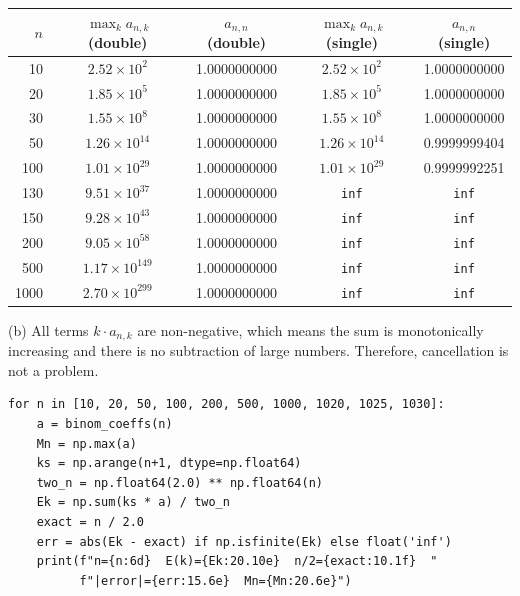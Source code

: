 \documentclass[letterpaper, 11pt]{article}
\newcommand{\1}{\mathds{1}}	%
\theoremstyle{definition}
\begin{document}
\begin{center}
\begin{tabular}{r|cc|cc}
$n$ & $\max_k a_{n,k}$ (double) & $a_{n,n}$ (double) & $\max_k a_{n,k}$ (single) & $a_{n,n}$ (single) \\
\hline
10 & $2.52 \times 10^{2}$ & 1.0000000000 & $2.52 \times 10^{2}$ & 1.0000000000 \\
20 & $1.85 \times 10^{5}$ & 1.0000000000 & $1.85 \times 10^{5}$ & 1.0000000000 \\
30 & $1.55 \times 10^{8}$ & 1.0000000000 & $1.55 \times 10^{8}$ & 1.0000000000 \\
50 & $1.26 \times 10^{14}$ & 1.0000000000 & $1.26 \times 10^{14}$ & 0.9999999404 \\
100 & $1.01 \times 10^{29}$ & 1.0000000000 & $1.01 \times 10^{29}$ & 0.9999992251 \\
130 & $9.51 \times 10^{37}$ & 1.0000000000 & \texttt{inf} & \texttt{inf} \\
150 & $9.28 \times 10^{43}$ & 1.0000000000 & \texttt{inf} & \texttt{inf} \\
200 & $9.05 \times 10^{58}$ & 1.0000000000 & \texttt{inf} & \texttt{inf} \\
500 & $1.17 \times 10^{149}$ & 1.0000000000 & \texttt{inf} & \texttt{inf} \\
1000 & $2.70 \times 10^{299}$ & 1.0000000000 & \texttt{inf} & \texttt{inf}
\end{tabular}
\end{center}

(b) All terms $k \cdot a_{n,k}$ are non-negative, which means the sum is monotonically increasing and there is no subtraction of large numbers. Therefore, cancellation is not a problem.

\begin{lstlisting}
for n in [10, 20, 50, 100, 200, 500, 1000, 1020, 1025, 1030]:
    a = binom_coeffs(n)
    Mn = np.max(a)
    ks = np.arange(n+1, dtype=np.float64)
    two_n = np.float64(2.0) ** np.float64(n)
    Ek = np.sum(ks * a) / two_n
    exact = n / 2.0
    err = abs(Ek - exact) if np.isfinite(Ek) else float('inf')
    print(f"n={n:6d}  E(k)={Ek:20.10e}  n/2={exact:10.1f}  "
          f"|error|={err:15.6e}  Mn={Mn:20.6e}")
\end{lstlisting}
\end{document}
